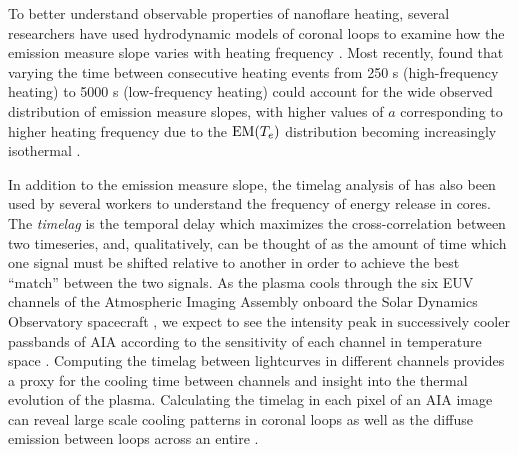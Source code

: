 To better understand observable properties of nanoflare heating, several researchers have used hydrodynamic models of coronal loops to examine how the emission measure slope varies with heating frequency \citep{mulu-moore_can_2011,bradshaw_diagnosing_2012,reep_diagnosing_2013}. Most recently, \citet{cargill_active_2014} found that varying the time between consecutive heating events from 250 s (high-frequency heating) to 5000 s (low-frequency heating) could account for the wide observed distribution of emission measure slopes, with higher values of $a$ corresponding to higher heating frequency due to the $\textup{EM}(T_e)$ distribution becoming increasingly isothermal \citep[see also][]{barnes_inference_2016-1}.

In addition to the emission measure slope, the timelag analysis of \citet{viall_evidence_2012} has also been used by several workers to understand the frequency of energy release in \AR{} cores. The \textit{timelag} is the temporal delay which maximizes the cross-correlation between two timeseries, and, qualitatively, can be thought of as the amount of time which one signal must be shifted relative to another in order to achieve the best ``match'' between the two signals. As the plasma cools through the six EUV channels of the Atmospheric Imaging Assembly \citep[AIA,][]{lemen_atmospheric_2012} onboard the Solar Dynamics Observatory spacecraft \citep[SDO,][]{pesnell_solar_2012}, we expect to see the intensity peak in successively cooler passbands of AIA according to the sensitivity of each channel in temperature space \citep{viall_patterns_2011}. Computing the timelag between lightcurves in different channels provides a proxy for the cooling time between channels and insight into the thermal evolution of the plasma. Calculating the timelag in each pixel of an AIA image can reveal large scale cooling patterns in coronal loops as well as the diffuse emission between loops across an entire \AR{}.

